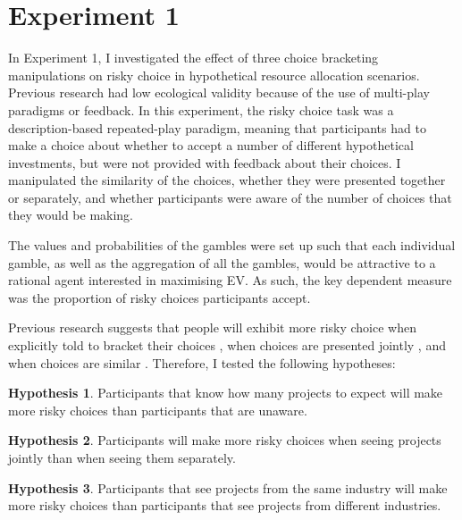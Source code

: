 \documentclass[a4paper, nobind, dvipsnames]{templates/ociamthesis}
\theoremstyle{definition}
\theoremstyle{definition}
\theoremstyle{definition}
\theoremstyle{definition}
\newtheorem{hypothesis}{Hypothesis}[chapter]
\theoremstyle{remark}
\begin{document}
\section{Experiment 1}

In Experiment 1, I investigated the effect of three choice bracketing
manipulations on risky choice in hypothetical resource allocation scenarios.
Previous research had low ecological validity because of the use of multi-play
paradigms or feedback. In this experiment, the risky choice task was a
description-based repeated-play paradigm, meaning that participants had to make
a choice about whether to accept a number of different hypothetical investments,
but were not provided with feedback about their choices. I manipulated the
similarity of the choices, whether they were presented together or separately,
and whether participants were aware of the number of choices that they would be
making.

The values and probabilities of the gambles were set up such that each
individual gamble, as well as the aggregation of all the gambles, would be
attractive to a rational agent interested in maximising EV. As such, the key
dependent measure was the proportion of risky choices participants accept.

Previous research suggests that people will exhibit more risky choice when
explicitly told to bracket their choices \autocite{sokolhessner2009,sokolhessner2012},
when choices are presented jointly \autocites[e.g.,][]{moher2010,hsee1999}, and when
choices are similar \autocites[e.g.,][]{dekay2005,markman1995}. Therefore, I tested the
following hypotheses:

\begin{hypothesis}
\protect\hypertarget{hyp:awareness-aggregation-1}{}{\label{hyp:awareness-aggregation-1} }Participants that know how many projects to expect will make more risky choices
than participants that are unaware.
\end{hypothesis}

\begin{hypothesis}
\protect\hypertarget{hyp:presentation-aggregation-1}{}{\label{hyp:presentation-aggregation-1} }Participants will make more risky choices when seeing projects jointly than when
seeing them separately.
\end{hypothesis}

\begin{hypothesis}
\protect\hypertarget{hyp:similarity-aggregation-1}{}{\label{hyp:similarity-aggregation-1} }Participants that see projects from the same industry will make more risky
choices than participants that see projects from different industries.
\end{hypothesis}
\end{document}

